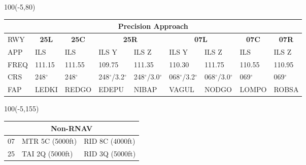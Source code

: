 \documentclass[10pt,landscape,a4paper]{article}
\begin{document}
\begin{textblock}{100}(-5,80)
\begin{table}[]
\begin{tabular}{|l|l|l|l|l|l|l|l|l|}
\multicolumn{9}{c}{\textbf{Precision Approach}}                                                                                                                                                                            \\ \hline
RWY  & \multicolumn{1}{c|}{\textbf{25L}} & \multicolumn{1}{c|}{\textbf{25C}} & \multicolumn{2}{c|}{\textbf{25R}} & \multicolumn{2}{c|}{\textbf{07L}} & \multicolumn{1}{c|}{\textbf{07C}} & \multicolumn{1}{c|}{\textbf{07R}} \\ \hline
APP  & ILS                               & ILS                               & ILS Y           & ILS Z           & ILS Y           & ILS Z           & ILS                               & ILS Z                             \\
FREQ & 111.15                            & 111.55                            & 109.75          & 111.35          & 110.30          & 111.75          & 110.55                            & 110.95                            \\
CRS  & 248$^\circ$                              & 248$^\circ$                              & 248$^\circ$/3.2$^\circ$       & 248$^\circ$/3.0$^\circ$       & 068$^\circ$/3.2$^\circ$       & 068$^\circ$/3.0$^\circ$       & 069$^\circ$                              & 069$^\circ$                              \\
FAP  & LEDKI                             & REDGO                             & EDEPU           & NIBAP           & VAGUL           & NODGO           & LOMPO                             & ROBSA                             \\ \hline
\end{tabular}
\end{table}
\end{textblock}



\begin{textblock}{100}(-5,155)
\begin{table}[]
\begin{tabular}{|l|l|l|}
\multicolumn{3}{c}{\textbf{Non-RNAV}} \\ \hline
07  & MTR 5C (5000ft)    & RID 8C (4000ft)   \\ \hline
25  & TAI 2Q (5000ft)    & RID 3Q (5000ft)   \\ \hline
\end{tabular}
\end{table}
\end{textblock}
\end{document}
